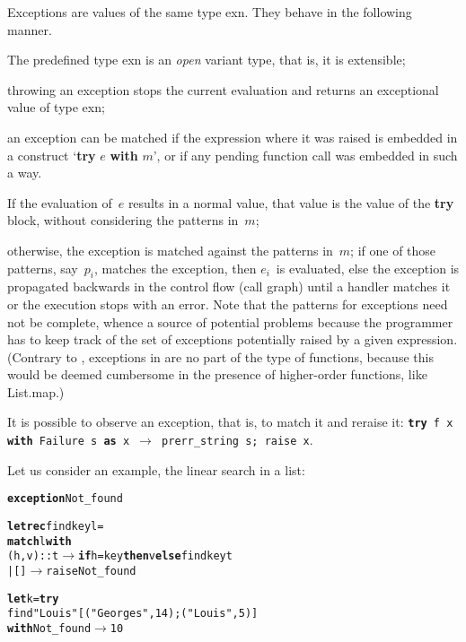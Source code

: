 Exceptions are values of the same type \textsf{exn}. They behave in
the following manner.
\begin{itemize*}

  \item The predefined type \textsf{exn} is an \emph{open} variant
    type, that is, it is extensible;

  \item throwing an exception stops the current evaluation and returns
    an exceptional value of type \textsf{exn};

  \item an exception can be matched if the expression where it was
    raised is embedded in a construct `\textsf{\textbf{try}
    $e$ \textbf{with} $m$}', or if any pending function call was
    embedded in such a way.
    \begin{itemize*}

      \item If the evaluation of~\(e\) results in a normal value, that
        value is the value of the \textsf{\textbf{try}} block, without
        considering the patterns in~\(m\);

      \item otherwise, the exception is matched against the patterns
        in~\(m\); if one of those patterns, say~\(p_i\), matches the
        exception, then \(e_i\)~is evaluated, else the exception is
        propagated backwards in the control flow (call graph) until a
        handler matches it or the execution stops with an error. Note
        that the patterns for exceptions need not be complete, whence
        a source of potential problems because the programmer has to
        keep track of the set of exceptions potentially raised by a
        given expression. (Contrary to \Java, exceptions in \OCaml are
        no part of the type of functions, because this would be deemed
        cumbersome in the presence of higher\hyp{}order functions,
        like \textsf{List.map}.)

    \end{itemize*}

  \item It is possible to observe an exception, that is, to match it
    and reraise it: \texttt{\textbf{try} f x \textbf{with} Failure
    s \textbf{as} x $\rightarrow$ prerr\_string s; raise x}.

\end{itemize*}
Let us consider an example, the linear search in a list:
\begin{alltt}
\textbf{exception} Not_found

\textbf{let rec} find key l =
  \textbf{match} l \textbf{with}
    (h,v)::t \(\rightarrow\) \textbf{if} h = key \textbf{then} v \textbf{else} find key t
  |       [] \(\rightarrow\) raise Not_found

\textbf{let} k = \textbf{try}
          find "Louis" [("Georges",14); ("Louis",5)]
        \textbf{with} Not_found \(\rightarrow\) 10
\end{alltt}


